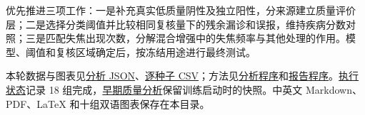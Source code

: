 \documentclass[
  10pt,
]{article}
\begin{document}
优先推进三项工作：一是补充真实低质量阴性及独立阳性，分来源建立质量评价层；二是选择分类阈值并比较相同复核量下的残余漏诊和误报，维持疾病分数对照；三是匹配失焦出现次数，分解混合增强中的失焦频率与其他处理的作用。模型、阈值和复核区域确定后，按冻结用途进行最终测试。

本轮数据与图表见\href{completed-analysis.json}{分析
JSON}、\href{per-seed-results.csv}{逐种子
CSV}；方法见\href{../../../../tools/analyze_completed_followup_20261115.py}{分析程序}和\href{../../../../tools/report_completed_followup_20261115.py}{报告程序}。\href{../../../../runs/followup_20261115/pipeline/status.json}{执行状态}记录
18
组完成，\href{../quality-and-training.zh.md}{早期质量分析}保留训练启动时的快照。中英文
Markdown、PDF、LaTeX 和十组双语图表保存在本目录。
\end{document}
